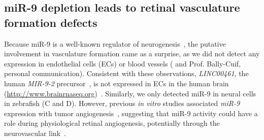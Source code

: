 \subsection{miR-9 depletion leads to retinal vasculature formation
defects}

Because miR-9 is a well-known regulator of neurogenesis~\citep{Coolen:2013dw}, the putative
involvement in vasculature formation came as a surprise, as we did not
detect any expression in endothelial cells (ECs) or blood vessels ( and Prof. Bally-Cuif, personal communication). Consistent with these
observations, \emph{LINC00461}, the human \emph{MIR-9-2} precursor~\citep{Rodriguez:2004kc}, is not expressed
in ECs in the human brain
(\url{http://www.brainrnaseq.org})~\citep{Zhang:2016bm}. Similarly, we only
detected miR-9 in neural cells in zebrafish (C and D).
However, previous \emph{in vitro} studies associated \emph{miR-9}
expression with tumor angiogenesis~\citep{Zhang:2012ih, Zhuang:2012jw},
suggesting that miR-9 activity could have a role during physiological
retinal angiogenesis, potentially through the neurovascular link~\citep{Quaegebeur:2011bd}.

